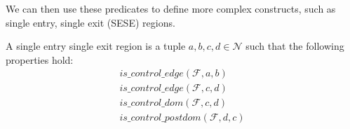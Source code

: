     We can then use these predicates to define more complex constructs, such as
    single entry, single exit (SESE) regions.

    \begin{definition}{}{}{}
        A single entry single exit region is a tuple $a,b,c,d\in\mathcal N$ such
        that the following properties hold:
        \begin{align*}
            is\_control\_edge(\mathcal{F},a,b)\\
            is\_control\_edge(\mathcal{F},c,d)\\
            is\_control\_dom(\mathcal{F},c,d)\\
            is\_control\_postdom(\mathcal{F},d,c)\\
        \end{align*}
    \end{definition}